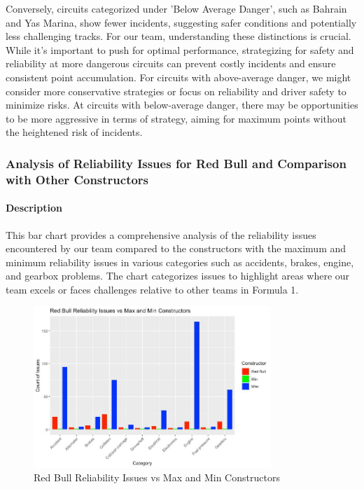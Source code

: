 \documentclass{article}
\begin{document}
Conversely, circuits categorized under 'Below Average Danger', such as Bahrain and Yas Marina, show fewer incidents, suggesting safer conditions and potentially less challenging tracks. For our team, understanding these distinctions is crucial. While it's important to push for optimal performance, strategizing for safety and reliability at more dangerous circuits can prevent costly incidents and ensure consistent point accumulation.
For circuits with above-average danger, we might consider more conservative strategies or focus on reliability and driver safety to minimize risks. At circuits with below-average danger, there may be opportunities to be more aggressive in terms of strategy, aiming for maximum points without the heightened risk of incidents.


\subsubsection{Analysis of Reliability Issues for Red Bull and Comparison with Other Constructors}

\paragraph{Description}
This bar chart provides a comprehensive analysis of the reliability issues encountered by our team compared to the constructors with the maximum and minimum reliability issues in various categories such as accidents, brakes, engine, and gearbox problems. The chart categorizes issues to highlight areas where our team excels or faces challenges relative to other teams in Formula 1.

\begin{figure}[H]
    \centering
    \includegraphics[width=0.8\textwidth]{images/querie/reliability.jpeg}
    \caption{Red Bull Reliability Issues vs Max and Min Constructors}
\end{figure}
\end{document}
